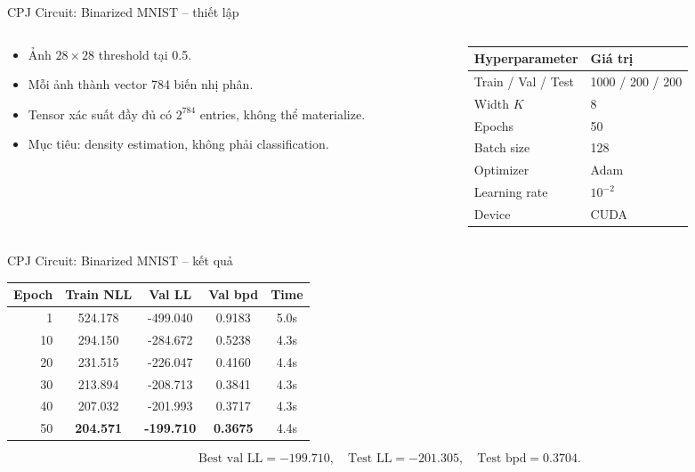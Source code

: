 \begin{frame}{CPJ Circuit: Binarized MNIST -- thiết lập}
\begin{columns}[T,totalwidth=\textwidth]
    \begin{column}{0.50\textwidth}
        \begin{itemize}
            \item Ảnh $28\times28$ threshold tại 0.5.
            \item Mỗi ảnh thành vector 784 biến nhị phân.
            \item Tensor xác suất đầy đủ có $2^{784}$ entries, không thể materialize.
            \item Mục tiêu: density estimation, không phải classification.
        \end{itemize}
    \end{column}
    \begin{column}{0.46\textwidth}
        \small
        \renewcommand{\arraystretch}{1.18}
        \begin{tabular}{ll}
        \toprule
        \textbf{Hyperparameter} & \textbf{Giá trị} \\
        \midrule
        Train / Val / Test & 1000 / 200 / 200 \\
        Width $K$ & 8 \\
        Epochs & 50 \\
        Batch size & 128 \\
        Optimizer & Adam \\
        Learning rate & $10^{-2}$ \\
        Device & CUDA \\
        \bottomrule
        \end{tabular}
    \end{column}
\end{columns}
\end{frame}

\begin{frame}{CPJ Circuit: Binarized MNIST -- kết quả}
\centering
\small
\renewcommand{\arraystretch}{1.15}
\begin{tabular}{rcccc}
\toprule
\textbf{Epoch} & \textbf{Train NLL} & \textbf{Val LL} & \textbf{Val bpd} & \textbf{Time} \\
\midrule
1  & 524.178 & -499.040 & 0.9183 & 5.0s \\
10 & 294.150 & -284.672 & 0.5238 & 4.3s \\
20 & 231.515 & -226.047 & 0.4160 & 4.4s \\
30 & 213.894 & -208.713 & 0.3841 & 4.3s \\
40 & 207.032 & -201.993 & 0.3717 & 4.3s \\
50 & \textbf{204.571} & \textbf{-199.710} & \textbf{0.3675} & 4.4s \\
\bottomrule
\end{tabular}

\vspace{0.12cm}
\[
    \text{Best val LL}=-199.710,\quad
    \text{Test LL}=-201.305,\quad
    \text{Test bpd}=0.3704.
\]
\end{frame}

